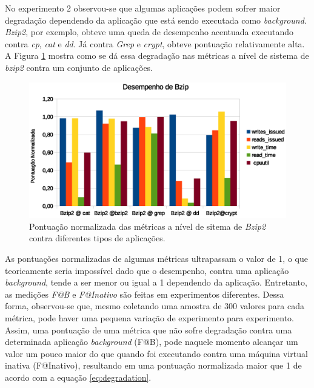 No experimento 2 observou-se que algumas aplicações podem sofrer maior degradação dependendo da aplicação que está sendo executada como \textit{background}. \textit{Bzip2}, por exemplo, obteve uma queda de desempenho acentuada executando contra \textit{cp}, \textit{cat} e \textit{dd}. Já contra \textit{Grep} e \textit{crypt}, obteve pontuação relativamente alta. A Figura \ref{bzip_performance} mostra como se dá essa degradação nas métricas a nível de sistema de \textit{bzip2} contra um conjunto de aplicações. 
\begin{figure}[!h]
\centering
\includegraphics [keepaspectratio=true,scale=0.8]{graficos/bzip_performance.eps}
\caption{Pontuação normalizada das métricas a nível de sitema de \textit{Bzip2} contra diferentes tipos de aplicações.}
\label{bzip_performance}
\end{figure}  

As pontuações normalizadas de algumas métricas ultrapassam o valor de 1, o que teoricamente seria impossível dado que o desempenho, contra uma aplicação \textit{background}, tende a ser menor ou igual a 1 dependendo da aplicação. Entretanto, as medições \textit{F@B} e \textit{F@Inativo} são feitas em experimentos diferentes. Dessa forma, observou-se que, mesmo coletando uma amostra de 300 valores para cada métrica, pode haver uma pequena variação de experimento para experimento. Assim, uma pontuação de uma métrica que não sofre degradação contra uma determinada aplicação \textit{background} (F@B), pode naquele momento alcançar um valor um pouco maior do que quando foi executando contra uma máquina virtual inativa (F@Inativo), resultando em uma pontuação normalizada maior que 1 de acordo com a equação \ref{eq:degradation}.

